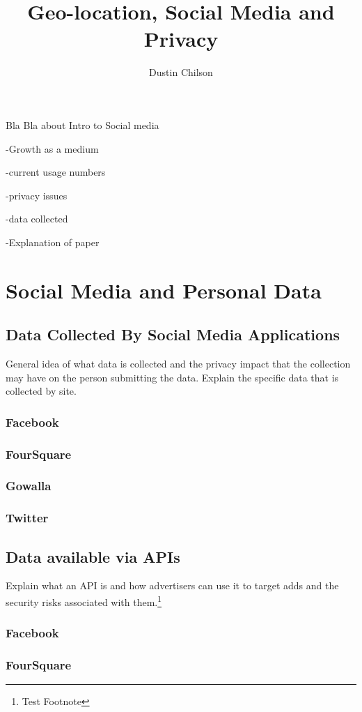 \documentclass[man]{apa}%
\title{Geo-location, Social Media and Privacy}
\author{Dustin Chilson}
\affiliation{Information Security Intelligence \\ Ferris State University}
\begin{document}
 
\maketitle  
Bla Bla about Intro to Social media 

-Growth as a medium 

-current usage numbers 

-privacy issues 

-data collected

-Explanation of paper

\section{Social Media and Personal Data}
\subsection{Data Collected By Social Media Applications}
General idea of what data is collected and the privacy impact that the
collection may have on the person submitting the data. Explain the specific data
that is collected by site.

\subsubsection{Facebook}
\subsubsection{FourSquare}
\subsubsection{Gowalla}
\subsubsection{Twitter}

\subsection{Data available via APIs}
Explain what an API is and how advertisers can use it to target adds and the
security risks associated with them.\footnote{Test Footnote}

\subsubsection{Facebook}
\subsubsection{FourSquare}
\end{document}
